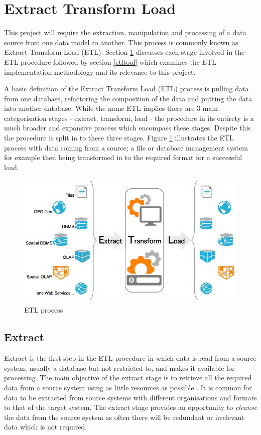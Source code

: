 \section{Extract Transform Load}\label{etlprocess}
This project will require the extraction, manipulation and processing of a data source from one data model to another. This process is commonly known as Extract Transform Load (ETL). Section \ref{etlprocess} discusses each stage involved in the ETL procedure followed by section \ref{etltool} which examines the ETL implementation methodology and its relevance to this project. 

A basic definition of the Extract Transform Load (ETL) process is pulling data from one database, refactoring the composition of the data and putting the data into another database. While the name ETL implies there are 3 main categorisation stages - extract, transform, load - the procedure in its entirety is a much broader and expansive process which encompass these stages. Despite this the procedure is split in to these three stages. Figure \ref{fig:etl} illustrates the ETL process with data coming from a source; a file or database management system for example then being transformed in to the required format for a successful load. \begin{figure}[h]\begin{center}\includegraphics[width=0.8\linewidth]{images/etl.jpg}\caption{ETL process}\label{fig:etl}\end{center}\end{figure}

\subsection{Extract}
Extract is the first step in the ETL procedure in which data is read from a source system, usually a database but not restricted to, and makes it available for processing. The main objective of the extract stage is to retrieve all the required data from a source system using as little resources as possible \cite{etlref1}. It is common for data to be extracted from source systems with different organisations and formats to that of the target system. The extract stage provides an opportunity to \textit{cleanse} the data from the source system as often there will be redundant or irrelevant data which is not required.

